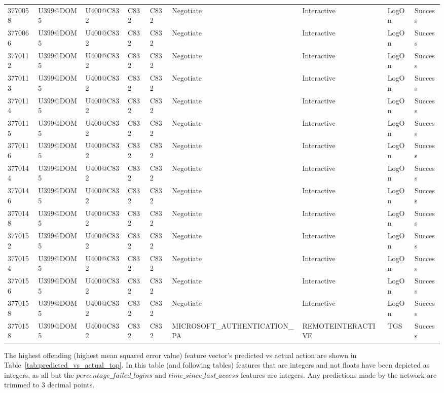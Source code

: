 \begin{table}[htbp]
{\begin{tabular}{lllllllll}
			3770058 & U399@DOM5 & U400@C832 & C832 & C832 & Negotiate & Interactive & LogOn & Success \\
			3770066 & U399@DOM5 & U400@C832 & C832 & C832 & Negotiate & Interactive & LogOn & Success \\
			3770112 & U399@DOM5 & U400@C832 & C832 & C832 & Negotiate & Interactive & LogOn & Success \\
			3770113 & U399@DOM5 & U400@C832 & C832 & C832 & Negotiate & Interactive & LogOn & Success \\
			3770114 & U399@DOM5 & U400@C832 & C832 & C832 & Negotiate & Interactive & LogOn & Success \\
			3770115 & U399@DOM5 & U400@C832 & C832 & C832 & Negotiate & Interactive & LogOn & Success \\
			3770116 & U399@DOM5 & U400@C832 & C832 & C832 & Negotiate & Interactive & LogOn & Success \\
			3770144 & U399@DOM5 & U400@C832 & C832 & C832 & Negotiate & Interactive & LogOn & Success \\
			3770146 & U399@DOM5 & U400@C832 & C832 & C832 & Negotiate & Interactive & LogOn & Success \\
			3770148 & U399@DOM5 & U400@C832 & C832 & C832 & Negotiate & Interactive & LogOn & Success \\
			3770152 & U399@DOM5 & U400@C832 & C832 & C832 & Negotiate & Interactive & LogOn & Success \\
			3770154 & U399@DOM5 & U400@C832 & C832 & C832 & Negotiate & Interactive & LogOn & Success \\
			3770156 & U399@DOM5 & U400@C832 & C832 & C832 & Negotiate & Interactive & LogOn & Success \\
			3770158 & U399@DOM5 & U400@C832 & C832 & C832 & Negotiate & Interactive & LogOn & Success \\
			3770158 & U399@DOM5 & U400@C832 & C832 & C832 & MICROSOFT_AUTHENTICATION_PA & REMOTEINTERACTIVE & TGS & Success
		\end{tabular}
	}
\end{table}

The highest offending (highest mean squared error value) feature vector's predicted vs actual action are shown in Table~\ref{tab:predicted_vs_actual_top}. In this table (and following tables) features that are integers and not floats have been depicted as integers, as all but the \(percentage\_failed\_logins\) and \(time\_since\_last\_access\) features are integers. Any predictions made by the network are trimmed to 3 decimal points.

